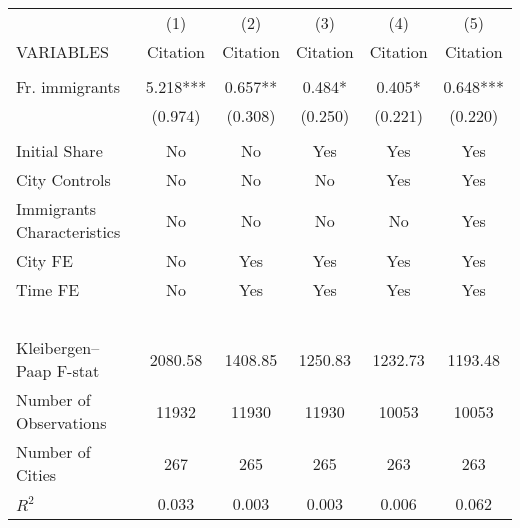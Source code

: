 \begin{tabular}{lccccc} \hline
 & (1) & (2) & (3) & (4) & (5) \\
VARIABLES & Citation & Citation & Citation & Citation & Citation \\ \hline
 &  &  &  &  &  \\
Fr. immigrants & 5.218*** & 0.657** & 0.484* & 0.405* & 0.648*** \\
 & (0.974) & (0.308) & (0.250) & (0.221) & (0.220) \\
 &  &  &  &  &  \\
Initial Share & No & No & Yes & Yes & Yes \\
City Controls & No & No & No & Yes & Yes \\
Immigrants Characteristics & No & No & No & No & Yes \\
City FE & No & Yes & Yes & Yes & Yes \\
Time FE & No & Yes & Yes & Yes & Yes \\
~ & ~ & ~ & ~ & ~ & ~ \\
Kleibergen–Paap F-stat & 2080.58 & 1408.85 & 1250.83 & 1232.73 & 1193.48 \\
Number of Observations & 11932 & 11930 & 11930 & 10053 & 10053 \\
Number of Cities & 267 & 265 & 265 & 263 & 263 \\
 $ R^2$ & 0.033 & 0.003 & 0.003 & 0.006 & 0.062 \\ \hline
\end{tabular}
